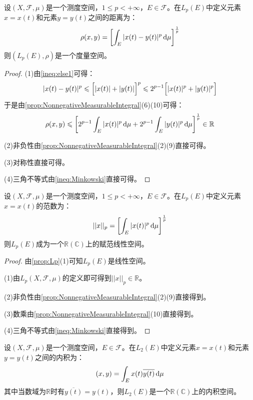 \begin{definition}
	设$(X,\mathscr{F},\mu)$是一个测度空间，$1\leqslant p<+\infty$，$E\in\mathscr{F}$。在$L_p(E)$中定义元素$x=x(t)$和元素$y=y(t)$之间的距离为：
	\begin{equation*}
		\rho(x,y)=\left[\int_{E}|x(t)-y(t)|^p\mathop{}\!\mathrm{d}\mu\right]^\frac{1}{p}
	\end{equation*}
	则$(L_p(E),\rho)$是一个度量空间。
\end{definition}
\begin{proof}
	(1)由\cref{ineq:else1}可得：
	\begin{equation*}
		|x(t)-y(t)|^p\leqslant\Bigl[|x(t)|+|y(t)|\Bigr]^p\leqslant2^{p-1}\Bigl[|x(t)|^p+|y(t)|^p\Bigr]
	\end{equation*}
	于是由\cref{prop:NonnegativeMeasurableIntegral}(6)(10)可得：
	\begin{equation*}
		\rho(x,y)\leqslant\left[2^{p-1}\int_{E}|x(t)|^p\mathop{}\!\mathrm{d}\mu+2^{p-1}\int_{E}|y(t)|^p\mathop{}\!\mathrm{d}\mu\right]^{\frac{1}{p}}\in\mathbb{R}
	\end{equation*}\par
	(2)非负性由\cref{prop:NonnegativeMeasurableIntegral}(2)(9)直接可得。\par
	(3)对称性直接可得。\par
	(4)三角不等式由\cref{ineq:Minkowski}直接可得。
\end{proof}
\begin{definition}
	设$(X,\mathscr{F},\mu)$是一个测度空间，$1\leqslant p<+\infty$，$E\in\mathscr{F}$。在$L_p(E)$中定义元素$x=x(t)$的范数为：
	\begin{equation*}
		||x||_p=\left[\int_{E}|x(t)|^p\mathop{}\!\mathrm{d}\mu\right]^\frac{1}{p}
	\end{equation*}
	则$L_p(E)$成为一个$\mathbb{R}(\mathbb{C})$上的赋范线性空间。
\end{definition}
\begin{proof}
	由\cref{prop:Lp}(1)可知$L_p(E)$是线性空间。\par
	(1)由$L_p(X,\mathscr{F},\mu)$的定义即可得到$||x||_p\in\mathbb{R}$。\par
	(2)非负性由\cref{prop:NonnegativeMeasurableIntegral}(2)(9)直接得到。\par
	(3)数乘由\cref{prop:NonnegativeMeasurableIntegral}(10)直接得到。\par
	(4)三角不等式由\cref{ineq:Minkowski}直接得到。
\end{proof}
\begin{definition}
	设$(X,\mathscr{F},\mu)$是一个测度空间，$E\in\mathscr{F}$。在$L_2(E)$中定义元素$x=x(t)$和元素$y=y(t)$之间的内积为：
	\begin{equation*}
		(x,y)=\int_{E}x(t)\overline{y(t)}\mathop{}\!\mathrm{d}\mu
	\end{equation*}
	其中当数域为$\mathbb{R}$时有$\overline{y(t)}=y(t)$，则$L_2(E)$是一个$\mathbb{R}(\mathbb{C})$上的内积空间。
\end{definition}
